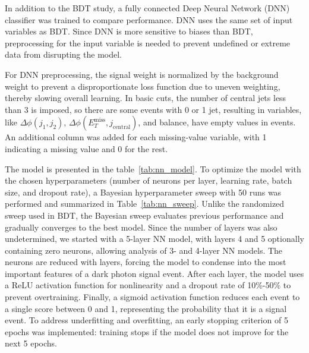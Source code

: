 In addition to the BDT study, a fully connected Deep Neural Network (DNN) classifier was trained to compare performance. DNN uses the same set of input variables as BDT. Since DNN is more sensitive to biases than BDT, preprocessing for the input variable is needed to prevent undefined or extreme data from disrupting the model. 

For DNN preprocessing, the signal weight is normalized by the background weight to prevent a disproportionate loss function due to uneven weighting, thereby slowing overall learning. In basic cuts, the number of central jets less than 3 is imposed, so there are some events with 0 or 1 jet, resulting in variables, like $\Delta\phi(j_1,j_2)$, $\Delta\phi(E_T^{\text{miss}}, j_{\text{central}})$, and balance, have empty values in events. An additional column was added for each missing-value variable, with 1 indicating a missing value and 0 for the rest.

The model is presented in the table~\ref{tab:nn_model}. To optimize the model with the chosen hyperparameters (number of neurons per layer, learning rate, batch size, and dropout rate), a Bayesian hyperparameter sweep with 50 runs was performed and summarized in Table~\ref{tab:nn_sweep}. Unlike the randomized sweep used in BDT, the Bayesian sweep evaluates previous performance and gradually converges to the best model. Since the number of layers was also undetermined, we started with a 5-layer NN model, with layers 4 and 5 optionally containing zero neurons, allowing analysis of 3- and 4-layer NN models. The neurons are reduced with layers, forcing the model to condense into the most important features of a dark photon signal event. After each layer, the model uses a ReLU activation function for nonlinearity and a dropout rate of 10\%-50\% to prevent overtraining. Finally, a sigmoid activation function reduces each event to a single score between 0 and 1, representing the probability that it is a signal event. To address underfitting and overfitting, an early stopping criterion of 5 epochs was implemented: training stops if the model does not improve for the next 5 epochs.




